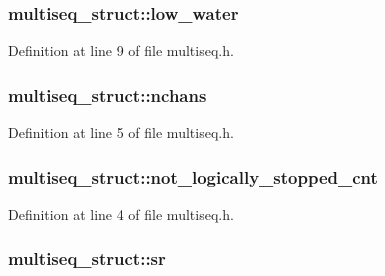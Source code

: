 \subsubsection[{\texorpdfstring{low\+\_\+water}{low_water}}]{ multiseq\+\_\+struct\+::low\+\_\+water}\hypertarget{structmultiseq__struct_acd56033becba780f5c56cbdf57a0c7ec}{}\label{structmultiseq__struct_acd56033becba780f5c56cbdf57a0c7ec}


Definition at line 9 of file multiseq.\+h.

\subsubsection[{\texorpdfstring{nchans}{nchans}}]{ multiseq\+\_\+struct\+::nchans}\hypertarget{structmultiseq__struct_ae928e5642ce3c69bfa88487f47b6c2f9}{}\label{structmultiseq__struct_ae928e5642ce3c69bfa88487f47b6c2f9}


Definition at line 5 of file multiseq.\+h.

\subsubsection[{\texorpdfstring{not\+\_\+logically\+\_\+stopped\+\_\+cnt}{not_logically_stopped_cnt}}]{ multiseq\+\_\+struct\+::not\+\_\+logically\+\_\+stopped\+\_\+cnt}\hypertarget{structmultiseq__struct_a263b80e299857699061a6ad9a1b16b42}{}\label{structmultiseq__struct_a263b80e299857699061a6ad9a1b16b42}


Definition at line 4 of file multiseq.\+h.

\subsubsection[{\texorpdfstring{sr}{sr}}]{ multiseq\+\_\+struct\+::sr}\hypertarget{structmultiseq__struct_af45a4b34bb099aee40e63e5061c449b4}{}\label{structmultiseq__struct_af45a4b34bb099aee40e63e5061c449b4}



